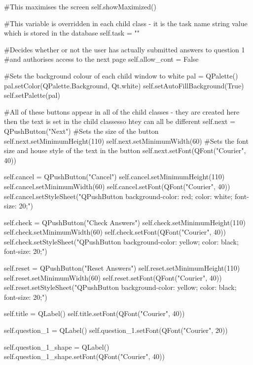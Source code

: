 \begin{landscape}
\begin{python}
        #This maximises the screen
        self.showMaximized()

        #This variable is overridden in each child class - it is the task name string value which is stored in the database
        self.task = ""

        #Decides whether or not the user has actually submitted answers to question 1
        #and authorises access to the next page
        self.allow_cont = False

        #Sets the background colour of each child window to white
        pal = QPalette()
        pal.setColor(QPalette.Background, Qt.white)
        self.setAutoFillBackground(True)
        self.setPalette(pal)     

        #All of these buttons appear in all of the child classes - they are created here then the text is set in the child classesso htey can all be different
        self.next = QPushButton("Next")
        #Sets the size of the button
        self.next.setMinimumHeight(110)
        self.next.setMinimumWidth(60)
        #Sets the font size and house style of the text in the button
        self.next.setFont(QFont("Courier", 40))

        self.cancel = QPushButton("Cancel")
        self.cancel.setMinimumHeight(110)
        self.cancel.setMinimumWidth(60)
        self.cancel.setFont(QFont("Courier", 40))
        self.cancel.setStyleSheet("QPushButton {background-color: red; color: white; font-size: 20;}")
        
        self.check = QPushButton("Check Answers")
        self.check.setMinimumHeight(110)
        self.check.setMinimumWidth(60)
        self.check.setFont(QFont("Courier", 40))
        self.check.setStyleSheet("QPushButton {background-color: yellow; color: black; font-size: 20;}")
        
        self.reset = QPushButton("Reset Answers")
        self.reset.setMinimumHeight(110)
        self.reset.setMinimumWidth(60)
        self.reset.setFont(QFont("Courier", 40))
        self.reset.setStyleSheet("QPushButton {background-color: yellow; color: black; font-size: 20;}")

        self.title = QLabel()
        self.title.setFont(QFont("Courier", 40))

        self.question_1 = QLabel()
        self.question_1.setFont(QFont("Courier", 20))

        self.question_1_shape = QLabel()
        self.question_1_shape.setFont(QFont("Courier", 40))
        

\end{python}
\end{landscape}
